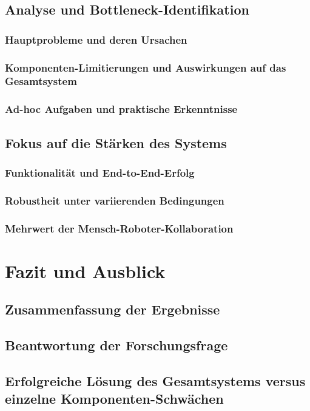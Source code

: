 \documentclass[12pt]{article}
\begin{document}
\subsection{Analyse und Bottleneck-Identifikation}
    \subsubsection{Hauptprobleme und deren Ursachen}
    \subsubsection{Komponenten-Limitierungen und Auswirkungen auf das Gesamtsystem}
    \subsubsection{Ad-hoc Aufgaben und praktische Erkenntnisse}

\subsection{Fokus auf die Stärken des Systems}
    \subsubsection{Funktionalität und End-to-End-Erfolg}
    \subsubsection{Robustheit unter variierenden Bedingungen}
    \subsubsection{Mehrwert der Mensch-Roboter-Kollaboration}

\newpage

\section{Fazit und Ausblick}
\label{sec:fazit}

\subsection{Zusammenfassung der Ergebnisse}
\subsection{Beantwortung der Forschungsfrage}
\subsection{Erfolgreiche Lösung des Gesamtsystems versus einzelne Komponenten-Schwächen}
\end{document}
